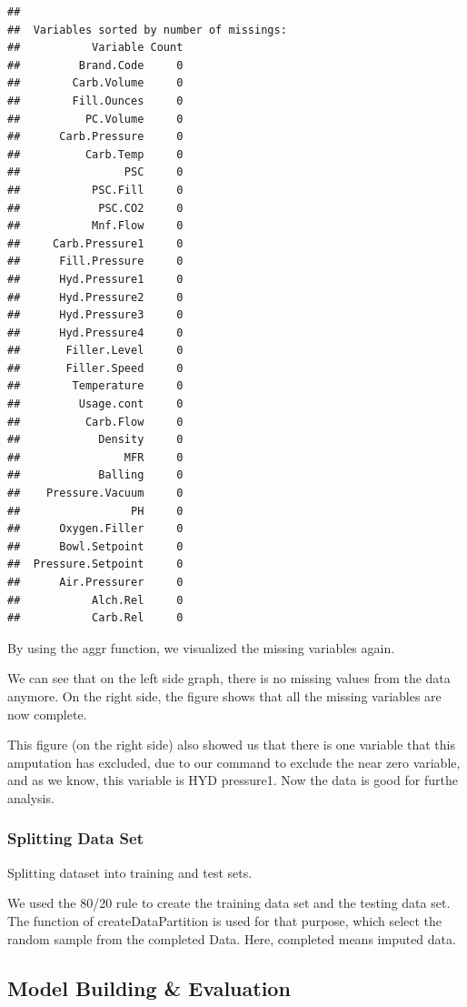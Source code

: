 \documentclass[]{article}
\begin{document}
\begin{verbatim}
## 
##  Variables sorted by number of missings: 
##           Variable Count
##         Brand.Code     0
##        Carb.Volume     0
##        Fill.Ounces     0
##          PC.Volume     0
##      Carb.Pressure     0
##          Carb.Temp     0
##                PSC     0
##           PSC.Fill     0
##            PSC.CO2     0
##           Mnf.Flow     0
##     Carb.Pressure1     0
##      Fill.Pressure     0
##      Hyd.Pressure1     0
##      Hyd.Pressure2     0
##      Hyd.Pressure3     0
##      Hyd.Pressure4     0
##       Filler.Level     0
##       Filler.Speed     0
##        Temperature     0
##         Usage.cont     0
##          Carb.Flow     0
##            Density     0
##                MFR     0
##            Balling     0
##    Pressure.Vacuum     0
##                 PH     0
##      Oxygen.Filler     0
##      Bowl.Setpoint     0
##  Pressure.Setpoint     0
##      Air.Pressurer     0
##           Alch.Rel     0
##           Carb.Rel     0
\end{verbatim}

By using the aggr function, we visualized the missing variables again.

We can see that on the left side graph, there is no missing values from
the data anymore. On the right side, the figure shows that all the
missing variables are now complete.

This figure (on the right side) also showed us that there is one
variable that this amputation has excluded, due to our command to
exclude the near zero variable, and as we know, this variable is HYD
pressure1. Now the data is good for furthe analysis.

\subsubsection{Splitting Data Set}\label{splitting-data-set}

Splitting dataset into training and test sets.

We used the 80/20 rule to create the training data set and the testing
data set. The function of createDataPartition is used for that purpose,
which select the random sample from the completed Data. Here, completed
means imputed data.

\subsection{Model Building \&
Evaluation}\label{model-building-evaluation}
\end{document}
